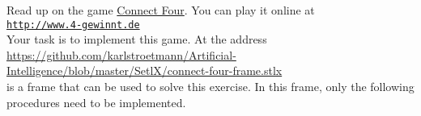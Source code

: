 \exercise
Read up on the game \href{https://en.wikipedia.org/wiki/Connect_Four}{Connect Four}.  You can play it online at
\\[0.2cm]
\hspace*{1.3cm}
\href{http://www.4-gewinnt.de}{\texttt{http://www.4-gewinnt.de}}
\\[0.2cm]
Your task is to implement this game.  At the address
\\[0.2cm]
\hspace*{1.3cm}
\href{https://github.com/karlstroetmann/Artificial-Intelligence/blob/master/SetlX/connect-four-frame.stlx}{https://github.com/karlstroetmann/Artificial-Intelligence/blob/master/SetlX/connect-four-frame.stlx}
\\[0.2cm]
is a frame that can be used to solve this exercise.  In this frame, only the following procedures need to be
implemented. 
